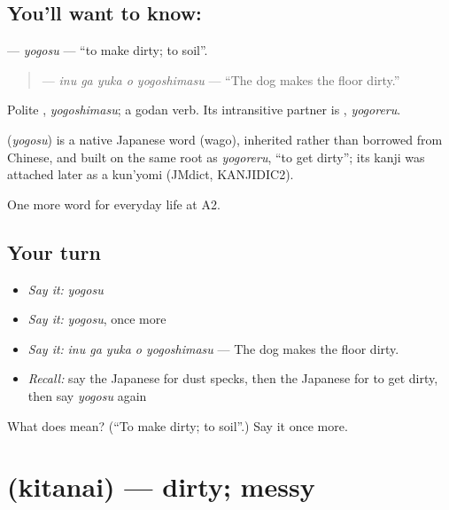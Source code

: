 \subsection*{You'll want to know: }
\textbf{} — \emph{yogosu} — \textquotedblleft{}to make dirty; to soil\textquotedblright{}.

\begin{quote}
\textbf{  } — \emph{inu ga yuka o yogoshimasu} — \textquotedblleft{}The dog makes the floor dirty.\textquotedblright{}
\end{quote}

Polite \textbf{}, \emph{yogoshimasu}; a godan verb. Its intransitive partner is \textbf{}, \emph{yogoreru}.

\begin{cousinweb}
\textbf{} (\emph{yogosu}) is a native Japanese word (wago), inherited rather than borrowed from Chinese, and built on the same root as \emph{yogoreru}, \textquotedblleft{}to get dirty\textquotedblright{}; its kanji was attached later as a kun'yomi (JMdict, KANJIDIC2).
\end{cousinweb}

\begin{grammarlens}[title={What you've built}]
One more word for everyday life at A2.
\end{grammarlens}

\subsection*{Your turn}
\begin{itemize}
\raggedright
  \item \emph{Say it:} \emph{yogosu}
  \item \emph{Say it:} \emph{yogosu}, once more
  \item \emph{Say it:} \emph{inu ga yuka o yogoshimasu} — The dog makes the floor dirty.
  \item \emph{Recall:} say the Japanese for dust specks, then the Japanese for to get dirty, then say \emph{yogosu} again
\end{itemize}

\begin{tcolorbox}[breakable,colback=teal!4,colframe=teal!35!black,title={Before you move on}]
What does  mean? (\textquotedblleft{}To make dirty; to soil\textquotedblright{}.) Say it once more.
\end{tcolorbox}
\section[\texorpdfstring{\ja{きたない} (kitanai)}{きたない (kitanai)}]{ (kitanai) — dirty; messy}

